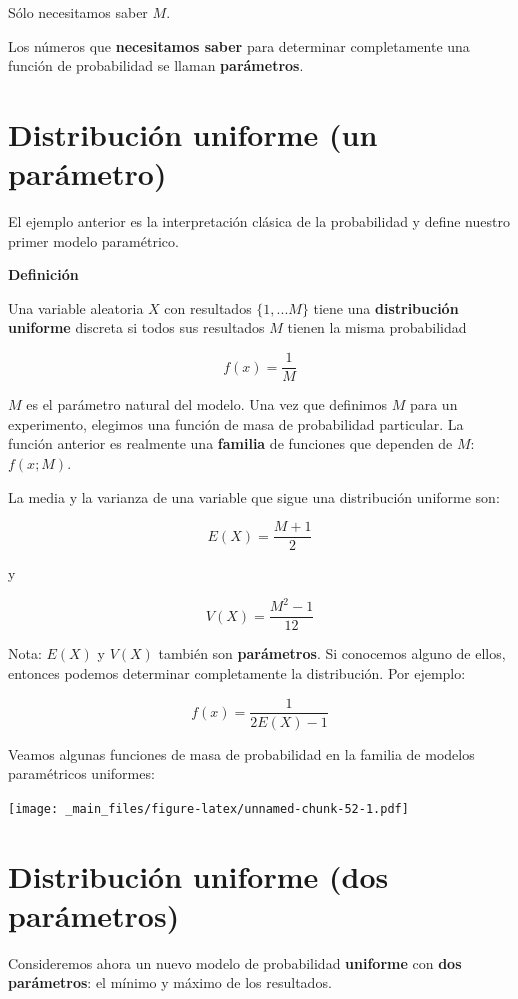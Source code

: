 \documentclass[
]{book}
\begin{document}
Sólo necesitamos saber \(M\).

Los números que \textbf{necesitamos saber} para determinar completamente una función de probabilidad se llaman \textbf{parámetros}.

\hypertarget{distribuciuxf3n-uniforme-un-paruxe1metro}{%
\section{Distribución uniforme (un parámetro)}\label{distribuciuxf3n-uniforme-un-paruxe1metro}}

El ejemplo anterior es la interpretación clásica de la probabilidad y define nuestro primer modelo paramétrico.

\textbf{Definición}

Una variable aleatoria \(X\) con resultados \(\{1,...M\}\) tiene una \textbf{distribución uniforme} discreta si todos sus resultados \(M\) tienen la misma probabilidad

\[f(x)=\frac{1}{M}\]

\(M\) es el parámetro natural del modelo. Una vez que definimos \(M\) para un experimento, elegimos una función de masa de probabilidad particular. La función anterior es realmente una \textbf{familia} de funciones que dependen de \(M\): \(f(x; M)\).

La media y la varianza de una variable que sigue una distribución uniforme son:

\[E(X)= \frac{M+1}{2}\]

y

\[V(X)= \frac{M^2-1}{12}\]

Nota: \(E(X)\) y \(V(X)\) también son \textbf{parámetros}. Si conocemos alguno de ellos, entonces podemos determinar completamente la distribución. Por ejemplo:

\[f(x)=\frac{1}{2E(X)-1}\]

Veamos algunas funciones de masa de probabilidad en la familia de modelos paramétricos uniformes:

\texttt{[image: \_main\_files/figure-latex/unnamed-chunk-52-1.pdf]}

\hypertarget{distribuciuxf3n-uniforme-dos-paruxe1metros}{%
\section{Distribución uniforme (dos parámetros)}\label{distribuciuxf3n-uniforme-dos-paruxe1metros}}

Consideremos ahora un nuevo modelo de probabilidad \textbf{uniforme} con \textbf{dos parámetros}: el mínimo y máximo de los resultados.
\end{document}
